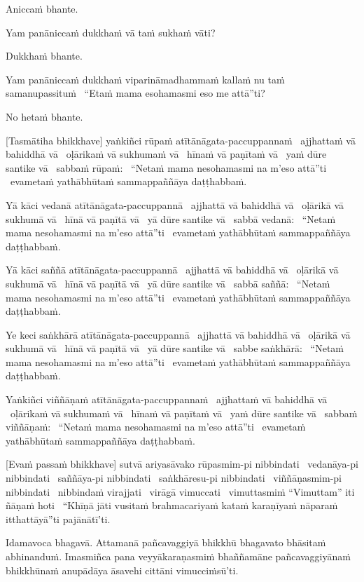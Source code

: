 Aniccaṁ bhante.

Yam panāniccaṁ dukkhaṁ vā taṁ sukhaṁ vāti?

Dukkhaṁ bhante.

Yam panāniccaṁ dukkhaṁ viparināmadhammaṁ kallaṁ nu taṁ samanupassituṁ \breathmark\ ``Etaṁ mama esohamasmi eso me attā''ti?

No hetaṁ bhante.

[Tasmātiha bhikkhave] yaṅkiñci rūpaṁ atītānāgata-paccuppannaṁ \breathmark\ ajjhattaṁ vā bahiddhā vā \breathmark\ oḷārikaṁ vā sukhumaṁ vā \breathmark\ hīnaṁ vā paṇītaṁ vā \breathmark\ yaṁ dūre santike vā \breathmark\ sabbaṁ rūpaṁ: \breathmark\ ``Netaṁ mama nesohamasmi na m’eso attā''ti \breathmark\ evametaṁ yathābhūtaṁ sammappaññāya daṭṭhabbaṁ.

Yā kāci vedanā atītānāgata-paccuppannā \breathmark\ ajjhattā vā bahiddhā vā \breathmark\ oḷārikā vā sukhumā vā \breathmark\ hīnā vā paṇītā vā \breathmark\ yā dūre santike vā \breathmark\ sabbā vedanā: \breathmark\ ``Netaṁ mama nesohamasmi na m’eso attā''ti \breathmark\ evametaṁ yathābhūtaṁ sammappaññāya daṭṭhabbaṁ.

Yā kāci saññā atītānāgata-paccuppannā \breathmark\ ajjhattā vā bahiddhā vā \breathmark\ oḷārikā vā sukhumā vā \breathmark\ hīnā vā paṇītā vā \breathmark\ yā dūre santike vā \breathmark\ sabbā saññā: \breathmark\ ``Netaṁ mama nesohamasmi na m’eso attā''ti \breathmark\ evametaṁ yathābhūtaṁ sammappaññāya daṭṭhabbaṁ.

Ye keci saṅkhārā atītānāgata-paccuppannā \breathmark\ ajjhattā vā bahiddhā vā \breathmark\ oḷārikā vā sukhumā vā \breathmark\ hīnā vā paṇītā vā \breathmark\ yā dūre santike vā \breathmark\ sabbe saṅkhārā: \breathmark\ ``Netaṁ mama nesohamasmi na m’eso attā''ti \breathmark\ evametaṁ yathābhūtaṁ sammappaññāya daṭṭhabbaṁ.

Yaṅkiñci viññāṇaṁ atītānāgata-paccuppannaṁ \breathmark\ ajjhattaṁ vā bahiddhā vā \breathmark\ oḷārikaṁ vā sukhumaṁ vā \breathmark\ hīnaṁ vā paṇītaṁ vā \breathmark\ yaṁ dūre santike vā \breathmark\ sabbaṁ viññāṇaṁ: \breathmark\ ``Netaṁ mama nesohamasmi na m’eso attā''ti \breathmark\ evametaṁ yathābhūtaṁ sammappaññāya daṭṭhabbaṁ.

[Evaṁ passaṁ bhikkhave] sutvā ariyasāvako rūpasmim-pi nibbindati \breathmark\ vedanāya-pi nibbindati \breathmark\ saññāya-pi nibbindati \breathmark\ saṅkhāresu-pi nibbindati \breathmark\ viññāṇasmim-pi nibbindati \breathmark\ nibbindaṁ virajjati \breathmark\ virāgā vimuccati \breathmark\ vimuttasmiṁ ``Vimuttam'' iti ñāṇaṁ hoti \breathmark\ ``Khīṇā jāti vusitaṁ brahmacariyaṁ kataṁ karaṇīyaṁ nāparaṁ itthattāyā''ti pajānātī’ti.

Idamavoca bhagavā. Attamanā pañcavaggiyā bhikkhū bhagavato bhāsitaṁ abhinanduṁ. Imasmiñca pana veyyākaraṇasmiṁ bhaññamāne pañcavaggiyānaṁ bhikkhūnaṁ anupādāya āsavehi cittāni vimucciṁsū’ti.

\suttaRef{[SN 22.59]}

